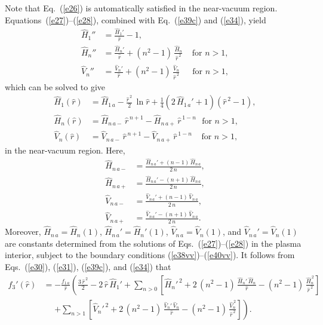 \documentclass[12pt,prb,aps]{revtex4-1}
\begin{document}
Note that Eq.~(\ref{e26}) is automatically satisfied in the near-vacuum region. Equations~(\ref{e27})--(\ref{e28}), combined with Eq.~(\ref{e39c}) and (\ref{e34}), 
yield
\begin{align}\label{e36y}
\hat{H}_1''&= \frac{\hat{H}_1' }{\hat{r}}
-1,\\[0.5ex]
\hat{H}_n''&= \frac{\hat{H}_n'}{\hat{r}}+(n^2-1)\,\frac{\hat{H}_n}{\hat{r}^{\,2}}~~~~~\mbox{for $n>1$},\label{e37}\\[0.5ex]
\hat{V}_n''&= \frac{\hat{V}_n'}{\hat{r}}+(n^2-1)\,\frac{\hat{V}_n}{\hat{r}^{\,2}}~~~~~~\,\mbox{for $n>1$},\label{e38v}
\end{align}
which can be solved to give\,\cite{greene}
\begin{align}
\hat{H}_1(\hat{r}) &= \hat{H}_{1\,a} - \frac{\hat{r}^{\,2}}{2}\,\ln\hat{r} +\frac{1}{4}\left(2\,\hat{H}_{1\,a}'+1\right)(\hat{r}^{\,2}-1) ,\label{e37c}\\[0.5ex]
\hat{H}_n(\hat{r}) &= \hat{H}_{n\,a-}\,\hat{r}^{\,n+1} - \hat{H}_{n\,a+}\,\hat{r}^{\,1-n}~~~\mbox{for $n>1$},\\[0.5ex]
\hat{V}_n(\hat{r}) &= \hat{V}_{n\,a-}\,\hat{r}^{\,n+1} - \hat{V}_{n\,a+}\,\hat{r}^{\,1-n}~~~~~\mbox{for $n>1$},\label{e39cx}
\end{align}
in the near-vacuum region. Here, 
\begin{align}
\hat{H}_{n\,a-}&= \frac{\hat{H}_{n\,a}'+(n-1)\,\hat{H}_{n\,a}}{2\,n},\\[0.5ex]
\hat{H}_{n\,a+} &= \frac{\hat{H}_{n\,a}'-(n+1)\,\hat{H}_{n\,a}}{2\,n},\\[0.5ex]
\hat{V}_{n\,a-}&= \frac{\hat{V}_{n\,a}'+(n-1)\,\hat{V}_{n\,a}}{2\,n},\\[0.5ex]
\hat{V}_{n\,a+} &= \frac{\hat{V}_{n\,a}'-(n+1)\,\hat{V}_{n\,a}}{2\,n}.
\end{align}
Moreover, $\hat{H}_{n\,a}=\hat{H}_n(1)$, $\hat{H}_{n\,a}'=\hat{H}_n'(1)$, $\hat{V}_{n\,a}=\hat{V}_n(1)$,
and $\hat{V}_{n\,a}'=\hat{V}_n(1)$  are constants determined from the solutions of Eqs.~(\ref{e27})--(\ref{e28}) in the plasma interior,
subject to the boundary conditions (\ref{e38vv})--(\ref{e40vv}).  It follows from Eqs.~(\ref{e30}), (\ref{e31}),  (\ref{e39c}), and (\ref{e34}) that
\begin{align}\label{e58g}
f_3'(\hat{r})& = -\frac{f_{1\,a}}{\hat{r}}\left(\frac{3\,\hat{r}^{\,2}}{2}-2\,\hat{r}\,\hat{H}_1' +\sum_{n>0}\left[\hat{H}_n'^{\,2}+2\,(n^2-1)\,\frac{\hat{H}_n'\,\hat{H}_n}{\hat{r}}-(n^2-1)\,\frac{\hat{H}_n^{\,2}}{\hat{r}^{\,2}}\right]\right.\nonumber\\[0.5ex]
&\phantom{=}\left.+\sum_{n>1}\left[\hat{V}_n'^{\,2}+2\,(n^2-1)\,\frac{\hat{V}_n'\,\hat{V}_n}{\hat{r}}-(n^2-1)\,\frac{\hat{V}_n^{\,2}}{\hat{r}^{\,2}}\right]
\right).
\end{align}
\end{document}
